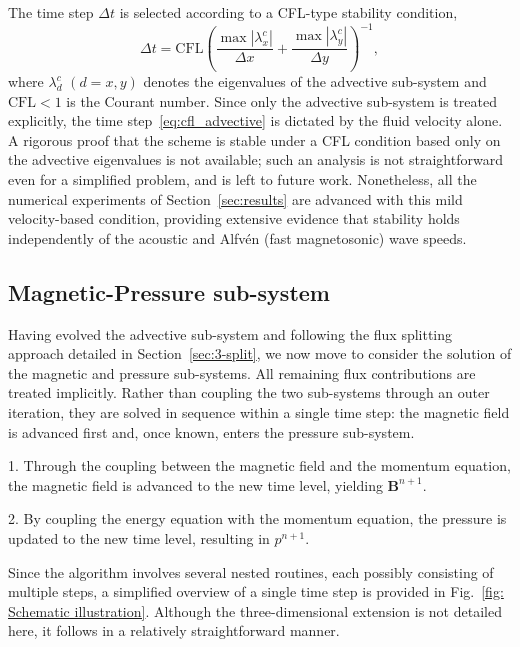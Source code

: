 \documentclass[a4paper,fleqn]{cas-sc}
\theoremstyle{definition}
\theoremstyle{remark}
\begin{document}
The time step $\Delta t$ is selected according to a CFL-type stability condition,
\begin{equation}
\Delta t
=
\mathrm{CFL}
\left(
\frac{\max|\lambda_x^c|}{\Delta x}
+
\frac{\max|\lambda_y^c|}{\Delta y}
\right)^{-1},
\label{eq:cfl_advective}
\end{equation}
where $\lambda_d^c$ $(d=x,y)$ denotes the eigenvalues of the advective sub-system
and $\mathrm{CFL}<1$ is the Courant number. Since only the advective sub-system is treated explicitly, the time
step~\eqref{eq:cfl_advective} is dictated by the fluid velocity alone. A rigorous proof that
the scheme is stable under a CFL condition based only on the advective eigenvalues
is not available; such an analysis is not straightforward even for a simplified
problem, and is left to future work. Nonetheless, all the numerical experiments of
Section~\ref{sec:results} are advanced with this mild velocity-based condition,
providing extensive evidence that stability holds independently of the acoustic and
Alfvén (fast magnetosonic) wave speeds.

\subsection{Magnetic-Pressure sub-system}
Having evolved the advective sub-system and following the flux splitting approach
detailed in Section~\ref{sec:3-split}, we now move to consider the solution of the
magnetic and pressure sub-systems. All remaining flux contributions are treated
implicitly. Rather than coupling the two sub-systems through an outer iteration, they
are solved in sequence within a single time step: the magnetic field is advanced first
and, once known, enters the pressure sub-system.



1. Through the coupling between the magnetic field and the momentum equation, the
   magnetic field is advanced to the new time level, yielding $\mathbf{B}^{n+1}$.

2. By coupling the energy equation with the momentum equation, the pressure
   is updated to the new time level, resulting in $p^{n+1}$.

Since the algorithm involves several nested routines, each possibly consisting of multiple steps, a simplified overview of a single time step is provided in Fig.~\ref{fig: Schematic illustration}. Although the three-dimensional extension is not detailed here, it follows in a relatively straightforward manner. 
\end{document}
